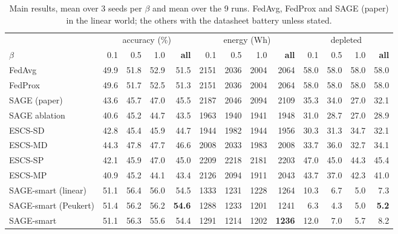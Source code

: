 \documentclass[11pt,a4paper]{article}
\begin{document}
\begin{table}[H]
\centering
\footnotesize
\caption{Main results, mean over 3 seeds per $\beta$ and mean over the 9 runs.
FedAvg, FedProx and SAGE (paper) in the linear world; the others with the
datasheet battery unless stated.}
\label{tab:main}
\begin{tabular}{lrrrrrrrrrrrr}
\toprule
& \multicolumn{4}{c}{accuracy (\%)} & \multicolumn{4}{c}{energy (Wh)} & \multicolumn{4}{c}{depleted} \\
\cmidrule(lr){2-5}\cmidrule(lr){6-9}\cmidrule(lr){10-13}
$\beta$ & 0.1 & 0.5 & 1.0 & \textbf{all} & 0.1 & 0.5 & 1.0 & \textbf{all} & 0.1 & 0.5 & 1.0 & \textbf{all} \\
\midrule
FedAvg            & 49.9 & 51.8 & 52.9 & 51.5 & 2151 & 2036 & 2004 & 2064 & 58.0 & 58.0 & 58.0 & 58.0 \\
FedProx           & 49.6 & 51.7 & 52.5 & 51.3 & 2151 & 2036 & 2004 & 2064 & 58.0 & 58.0 & 58.0 & 58.0 \\
SAGE (paper)      & 43.6 & 45.7 & 47.0 & 45.5 & 2187 & 2046 & 2094 & 2109 & 35.3 & 34.0 & 27.0 & 32.1 \\
SAGE ablation     & 40.6 & 45.2 & 44.7 & 43.5 & 1963 & 1940 & 1941 & 1948 & 31.0 & 28.7 & 27.0 & 28.9 \\
ESCS-SD           & 42.8 & 45.4 & 45.9 & 44.7 & 1944 & 1982 & 1944 & 1956 & 30.3 & 31.3 & 34.7 & 32.1 \\
ESCS-MD           & 44.3 & 47.8 & 47.7 & 46.6 & 2008 & 2033 & 1983 & 2008 & 33.7 & 36.0 & 32.7 & 34.1 \\
ESCS-SP           & 42.1 & 45.9 & 47.0 & 45.0 & 2209 & 2218 & 2181 & 2203 & 47.0 & 45.0 & 44.3 & 45.4 \\
ESCS-MP           & 40.9 & 45.2 & 44.1 & 43.4 & 2126 & 2094 & 1911 & 2043 & 43.7 & 37.0 & 42.3 & 41.0 \\
\midrule
SAGE-smart (linear)  & 51.1 & 56.4 & 56.0 & 54.5 & 1333 & 1231 & 1228 & 1264 & 10.3 & 6.7 & 5.0 & 7.3 \\
SAGE-smart (Peukert) & 51.4 & 56.2 & 56.2 & \textbf{54.6} & 1288 & 1233 & 1201 & 1241 & 6.3 & 4.3 & 5.0 & \textbf{5.2} \\
SAGE-smart           & 51.1 & 56.3 & 55.6 & 54.4 & 1291 & 1214 & 1202 & \textbf{1236} & 12.0 & 7.0 & 5.7 & 8.2 \\
\bottomrule
\end{tabular}
\end{table}
\end{document}
